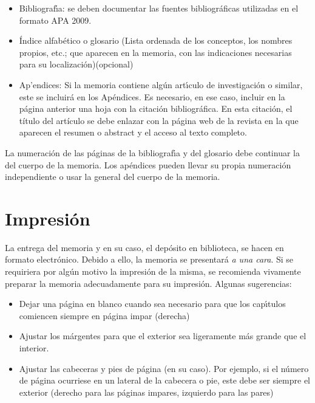 \begin{itemize}
\begin{itemize}
\item Análisis de antecedentes y aportación realizada.
\item Análisis temporal y de costes de desarrollo.
\item Análisis de requisitos, diseño e implementación.
\item Manual de usuario, en su caso.
\item Pruebas.
\item Comparación con otras alternativas.
\item Conclusiones y desarrollos futuros
 \end{itemize}
Estos puntos podrán ser ajustados y modificados en función de la naturaleza del proyecto realizado.
 \item Bibliograf{\'\i}a: se deben documentar las fuentes bibliográficas utilizadas en el formato APA 2009.
 \item  Índice alfabético o glosario (Lista ordenada de los conceptos, los nombres propios, etc.; 
 que aparecen en la memoria, con las indicaciones necesarias para su localización)(opcional)
 \item Ap'endices: Si la memoria contiene alg\'un art{\'\i}culo de investigaci\'on o similar, 
 este se incluir\'a en los Ap\'endices. 
 Es necesario, en ese caso, incluir en la página anterior una hoja con la citación bibliográfica. 
 En esta citación, el título del artículo se debe enlazar con la página web de la revista 
 en la que aparecen el resumen o abstract y el acceso al texto completo. 
 \end{itemize}
 La numeraci\'on de las p\'aginas de la bibliograf{\'\i}a y del glosario debe continuar la del cuerpo de la memoria.
 Los ap\'endices pueden llevar su propia numeraci\'on independiente o usar la general del cuerpo de la memoria.


\FloatBarrier
\section{Impresión}\label{sec:impresion} 
La entrega del memoria y en su caso, el dep\'osito en biblioteca, se hacen en formato electr\'onico. Debido a ello, la memoria se presentará \emph{a una cara}. Si se requiriera
por alg\'un motivo la impresi\'on de la misma, se recomienda vivamente preparar la memoria adecuadamente para su impresi\'on. Algunas sugerencias:
\begin{itemize}
 \item Dejar una p\'agina en blanco cuando sea necesario para que los cap{\'\i}tulos comiencen siempre en p\'agina impar (derecha)
 \item Ajustar los m\'argentes para que el exterior sea ligeramente m\'as grande que el interior.
 \item Ajustar las cabeceras y pies de p\'agina (en su caso). Por ejemplo, si el n\'umero de p\'agina ocurriese en un lateral
 de la cabecera o pie, este debe ser siempre el exterior (derecho para las p\'aginas impares, izquierdo para las pares)
\end{itemize}

